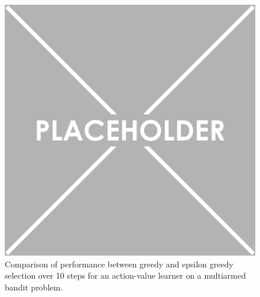 
\begin{figure}[h]
\includegraphics{Bandit10.png}
\caption{Comparison of performance between greedy and epsilon greedy selection over 10 steps for an action-value learner on a multiarmed bandit problem.}
\label{fig:Bandit10}
\end{figure}